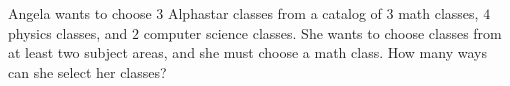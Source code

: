 Angela wants to choose $3$ Alphastar classes from a catalog of $3$ math classes, $4$ physics classes, and $2$ computer science classes. She wants to choose classes from at least two subject areas, and she must choose a math class. How many ways can she select her classes?
